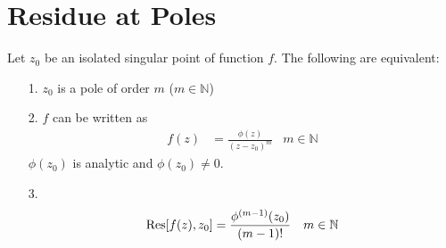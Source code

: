 \documentclass[12pt, english]{book}
\begin{document}
	\section{Residue at Poles} \label{Residue at Poles Section - Complex}
	
	\begin{theorem}
		\label{Residue at Poles Theorem - Complex}
		Let \(z_0\) be an isolated singular point of function \(f\). The following are equivalent: 
		\begin{itemize}
			\item[1.] \(z_0\) is a pole of order \(m\) (\(m \in \mathbb{N}\))
			\item[2.] \(f\) can be written as 
				\begin{align*}
					f(z) &= \frac{\phi(z)}{(z-z_0)^m}	&	m \in \mathbb{N}
				\end{align*}
				\(\phi(z_0)\) is analytic and \(\phi(z_0) \neq 0\).
			\item[3.]
			\begin{align*}
				\Res[f(z), z_0] &= \frac{\phi^{(m-1)}(z_0)}{(m-1)!}	&	m \in \mathbb{N}
			\end{align*}
		\end{itemize}
	\end{theorem}
\end{document}
